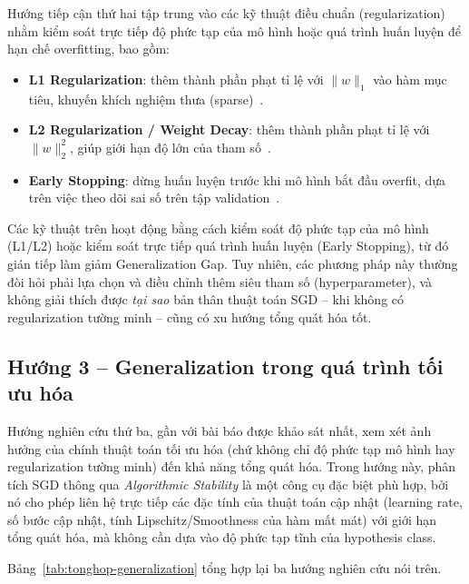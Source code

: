 Hướng tiếp cận thứ hai tập trung vào các kỹ thuật điều chuẩn (regularization) nhằm kiểm soát trực tiếp độ phức tạp của mô hình hoặc quá trình huấn luyện để hạn chế overfitting, bao gồm:
\begin{itemize}
    \item \textbf{L1 Regularization}: thêm thành phần phạt tỉ lệ với $\|w\|_1$ vào hàm mục tiêu, khuyến khích nghiệm thưa (sparse)~\cite{tibshirani1996regression}.
    \item \textbf{L2 Regularization / Weight Decay}: thêm thành phần phạt tỉ lệ với $\|w\|_2^2$, giúp giới hạn độ lớn của tham số~\cite{hoerl1970ridge}.
    \item \textbf{Early Stopping}: dừng huấn luyện trước khi mô hình bắt đầu overfit, dựa trên việc theo dõi sai số trên tập validation~\cite{prechelt1998early}.
\end{itemize}
Các kỹ thuật trên hoạt động bằng cách kiểm soát độ phức tạp của mô hình (L1/L2) hoặc kiểm soát trực tiếp quá trình huấn luyện (Early Stopping), từ đó gián tiếp làm giảm Generalization Gap. Tuy nhiên, các phương pháp này thường đòi hỏi phải lựa chọn và điều chỉnh thêm siêu tham số (hyperparameter), và không giải thích được \emph{tại sao} bản thân thuật toán SGD -- khi không có regularization tường minh -- cũng có xu hướng tổng quát hóa tốt.

\subsection{Hướng 3 -- Generalization trong quá trình tối ưu hóa}

Hướng nghiên cứu thứ ba, gần với bài báo được khảo sát nhất, xem xét ảnh hưởng của chính thuật toán tối ưu hóa (chứ không chỉ độ phức tạp mô hình hay regularization tường minh) đến khả năng tổng quát hóa. Trong hướng này, phân tích SGD thông qua \textit{Algorithmic Stability} là một công cụ đặc biệt phù hợp, bởi nó cho phép liên hệ trực tiếp các đặc tính của thuật toán cập nhật (learning rate, số bước cập nhật, tính Lipschitz/Smoothness của hàm mất mát) với giới hạn tổng quát hóa, mà không cần dựa vào độ phức tạp tĩnh của hypothesis class.

Bảng~\ref{tab:tonghop-generalization} tổng hợp lại ba hướng nghiên cứu nói trên.

